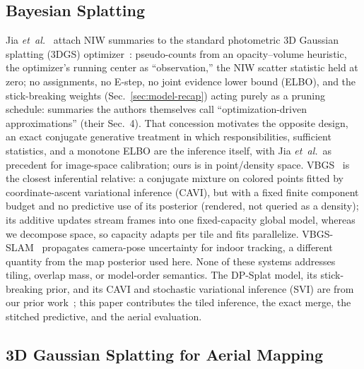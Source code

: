 \subsection{Bayesian Splatting}
\label{sec:related-bayes}

 Jia \emph{et~al.}~\cite{jia2026bayesian} attach NIW
summaries to the standard photometric 3D Gaussian splatting (3DGS)
optimizer~\cite{kerbl2023gaussian}: pseudo-counts from an opacity--volume heuristic, the
optimizer's running center as ``observation,'' the NIW scatter
statistic held at zero;
no assignments, no E-step, no joint evidence lower bound (ELBO), and
the stick-breaking weights (Sec.~\ref{sec:model-recap}) acting purely
as a pruning schedule: summaries the authors themselves call
``optimization-driven approximations'' (their Sec.~4). That concession
motivates the opposite design, an exact conjugate generative
treatment in which responsibilities, sufficient statistics, and a
monotone ELBO are the inference itself, with Jia \emph{et~al.}\ as
precedent for image-space calibration; ours is in point/density
space. VBGS~\cite{vandemaele2024vbgs} is the closest inferential
relative: a conjugate mixture on colored points fitted by
coordinate-ascent variational inference (CAVI), but with a fixed finite
component budget and no predictive use of its posterior (rendered,
not queried as a density); its additive updates stream frames into one
fixed-capacity global model, whereas we decompose space, so capacity
adapts per tile and fits parallelize.
VBGS-SLAM~\cite{zhu2026vbgsslam} propagates camera-pose uncertainty for
indoor tracking, a different quantity from the map posterior used
here. None of these systems addresses tiling, overlap mass, or
model-order semantics. The DP-Splat
model, its stick-breaking prior, and its CAVI and stochastic
variational inference (SVI) are from
our prior work~\cite{dong2026dpsplat}; this paper contributes the tiled
inference, the exact merge, the stitched predictive, and the aerial
evaluation.

\subsection{3D Gaussian Splatting for Aerial Mapping}
\label{sec:related-aerial}

